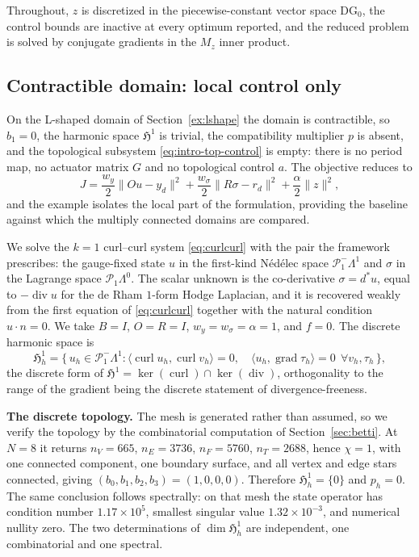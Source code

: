 \documentclass{article}
\DeclareMathOperator{\grad}{grad}
\DeclareMathOperator{\curl}{curl}
\DeclareMathOperator{\divergence}{div}
\newcommand{\HH}{\mathfrak H}
\newcommand{\ip}[2]{\langle #1,#2\rangle}
\newcommand{\norm}[1]{\lVert #1\rVert}
\begin{document}
Throughout, $z$ is discretized in the piecewise-constant vector space
$\mathrm{DG}_{0}$, the control bounds are inactive at every optimum reported,
and the reduced problem is solved by conjugate gradients in the $M_{z}$ inner
product.

\subsection{Contractible domain: local control only}\label{sec:lshape}

On the L-shaped domain of Section~\ref{ex:lshape} the domain is contractible,
so $b_{1}=0$, the harmonic space $\HH^{1}$ is trivial, the compatibility
multiplier $p$ is absent, and the topological subsystem
\eqref{eq:intro-top-control} is empty: there is no period map, no actuator
matrix $G$ and no topological control $a$. The objective reduces to
\[
 J=\frac{w_y}{2}\norm{Ou-y_d}^2
  +\frac{w_\sigma}{2}\norm{R\sigma-r_d}^2
  +\frac{\alpha}{2}\norm{z}^2 ,
\]
and the example isolates the local part of the formulation, providing the
baseline against which the multiply connected domains are compared.

We solve the $k=1$ curl--curl system \eqref{eq:curlcurl} with the pair the
framework prescribes: the gauge-fixed state $u$ in the first-kind N\'ed\'elec
space $\mathcal{P}^{-}_{1}\Lambda^{1}$ and $\sigma$ in the Lagrange space
$\mathcal{P}_{1}\Lambda^{0}$. The scalar unknown is the co-derivative
$\sigma=d^{*}u$, equal to $-\divergence u$ for the de Rham $1$-form Hodge
Laplacian, and it is recovered weakly from the first equation of
\eqref{eq:curlcurl} together with the natural condition $u\cdot n=0$. We take
$B=I$, $O=R=I$, $w_{y}=w_{\sigma}=\alpha=1$, and $f=0$. The discrete harmonic
space is
\[
  \HH^{1}_{h}
  =\bigl\{\,u_{h}\in\mathcal{P}^{-}_{1}\Lambda^{1}:
    \ip{\curl u_{h}}{\curl v_{h}}=0,\quad
    \ip{u_{h}}{\grad\tau_{h}}=0
    \ \ \forall v_{h},\tau_{h}\,\bigr\},
\]
the discrete form of $\HH^{1}=\ker(\curl)\cap\ker(\divergence)$, orthogonality
to the range of the gradient being the discrete statement of
divergence-freeness.

\medskip
\noindent\textbf{The discrete topology.}
The mesh is generated rather than assumed, so we verify the topology by the
combinatorial computation of Section~\ref{sec:betti}. At $N=8$ it returns
$n_{V}=665$, $n_{E}=3736$, $n_{F}=5760$, $n_{T}=2688$, hence $\chi=1$, with
one connected component, one boundary surface, and all vertex and edge stars
connected, giving $(b_{0},b_{1},b_{2},b_{3})=(1,0,0,0)$. Therefore
$\HH^{1}_{h}=\{0\}$ and $p_{h}=0$. The same conclusion follows spectrally: on
that mesh the state operator has condition number $1.17\times10^{5}$, smallest
singular value $1.32\times10^{-3}$, and numerical nullity zero. The two
determinations of $\dim\HH^{1}_{h}$ are independent, one combinatorial and one
spectral.
\end{document}

